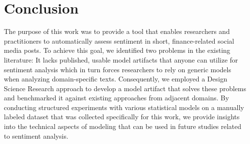 \section{Conclusion}
The purpose of this work was to provide a tool that enables researchers and practitioners to automatically assess sentiment in short, finance-related social media posts. To achieve this goal, we identified two problems in the existing literature: It lacks published, usable model artifacts that anyone can utilize for sentiment analysis which in turn forces researchers to rely on generic models when analyzing domain-specific texts. Consequently, we employed a Design Science Research approach to develop a model artifact that solves these problems and benchmarked it against existing approaches from adjacent domains. By conducting structured experiments with various statistical models on a manually labeled dataset that was collected specifically for this work, we provide insights into the technical aspects of modeling that can be used in future studies related to sentiment analysis.

